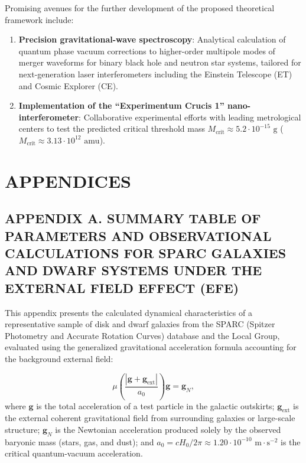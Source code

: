 \documentclass[11pt,a4paper]{article}
\theoremstyle{definition}
\begin{document}
Promising avenues for the further development of the proposed theoretical framework include:
\begin{enumerate}
\item \textbf{Precision gravitational-wave spectroscopy}: Analytical calculation of quantum phase vacuum corrections to higher-order multipole modes of merger waveforms for binary black hole and neutron star systems, tailored for next-generation laser interferometers including the Einstein Telescope (ET) and Cosmic Explorer (CE).

\item \textbf{Implementation of the ``Experimentum Crucis 1'' nano-interferometer}: Collaborative experimental efforts with leading metrological centers to test the predicted critical threshold mass $M_{\text{crit}} \approx 5.2 \cdot 10^{-15}\text{ g}$ ($M_{\text{crit}} \approx 3.13 \cdot 10^{12}\text{ amu}$).
\end{enumerate}

\clearpage
\appendix

\section*{APPENDICES}

\subsection*{APPENDIX A. SUMMARY TABLE OF PARAMETERS AND OBSERVATIONAL CALCULATIONS FOR SPARC GALAXIES AND DWARF SYSTEMS UNDER THE EXTERNAL FIELD EFFECT (EFE)}

This appendix presents the calculated dynamical characteristics of a representative sample of disk and dwarf galaxies from the SPARC (Spitzer Photometry and Accurate Rotation Curves) database and the Local Group, evaluated using the generalized gravitational acceleration formula accounting for the background external field:

\begin{equation}\label{eq:A.1}\tag{A.1}
\mu\left(\frac{|\mathbf{g} + \mathbf{g}_{\text{ext}}|}{a_0}\right) \mathbf{g} = \mathbf{g}_N,
\end{equation}
where $\mathbf{g}$ is the total acceleration of a test particle in the galactic outskirts; $\mathbf{g}_{\text{ext}}$ is the external coherent gravitational field from surrounding galaxies or large-scale structure; $\mathbf{g}_N$ is the Newtonian acceleration produced solely by the observed baryonic mass (stars, gas, and dust); and $a_0 = c H_0 / 2\pi \approx 1.20 \cdot 10^{-10}\text{ m}\cdot\text{s}^{-2}$ is the critical quantum-vacuum acceleration.
\end{document}
